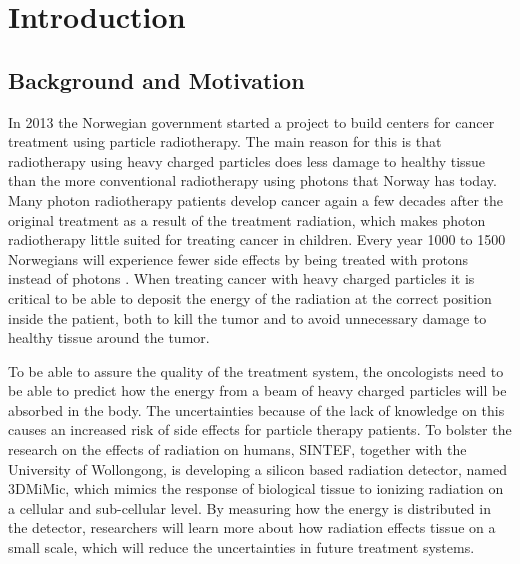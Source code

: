 \documentclass[../main/thesis.tex]{subfiles}
\begin{document}
\newpage

\chapter{Introduction}
\label{intro}
\section{Background and Motivation}
\label{i-background}
In 2013 the Norwegian government started a project to build centers for cancer treatment using particle radiotherapy. The main reason for this is that radiotherapy using heavy charged particles does less damage to healthy tissue than the more conventional radiotherapy using photons that Norway has today. Many photon radiotherapy patients develop cancer again a few decades after the original treatment as a result of the treatment radiation, which makes photon radiotherapy little suited for treating cancer in children. Every year 1000 to 1500 Norwegians will experience fewer side effects by being treated with protons instead of photons \citep{uio2012}. When treating cancer with heavy charged particles it is critical to be able to deposit the energy of the radiation at the correct position inside the patient, both to kill the tumor and to avoid unnecessary damage to healthy tissue around the tumor. %


To be able to assure the quality of the treatment system, the oncologists need to be able to predict how the energy from a beam of heavy charged particles will be absorbed in the body. The uncertainties because of the lack of knowledge on this causes an increased risk of side effects for particle therapy patients. To bolster the research on the effects of radiation on humans, SINTEF, together with the University of Wollongong, is developing a silicon based radiation detector, named 3DMiMic, which mimics the response of biological tissue to ionizing radiation on a cellular and sub-cellular level. By measuring how the energy is distributed in the detector, researchers will learn more about how radiation effects tissue on a small scale, which will reduce the uncertainties in future treatment systems. \citep{sintef3dmimic}
\end{document}
